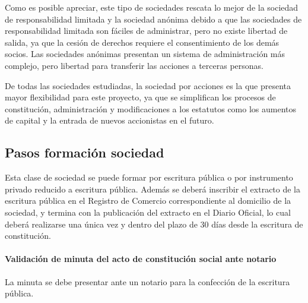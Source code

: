 Como es posible apreciar, este tipo de sociedades rescata lo mejor de la sociedad de responsabilidad
limitada y la sociedad anónima debido a que las sociedades de responsabilidad limitada son fáciles de administrar, 
pero no existe libertad de salida, ya que la cesión de derechos requiere el consentimiento de los demás socios. 
Las sociedades anónimas presentan un sistema de administración más complejo, pero libertad para transferir las acciones a terceras personas.

De todas las sociedades estudiadas, la sociedad por acciones 
es la que presenta mayor flexibilidad para este proyecto, ya que 
se simplifican los procesos de constitución, administración y modificaciones a los estatutos como los aumentos de capital
y la entrada de nuevos accionistas en el futuro.
 
\subsection{Pasos formación sociedad}
Esta clase de sociedad se puede formar por  escritura pública o por instrumento privado reducido a escritura pública. Además se deberá inscribir el extracto de la escritura pública en el Registro de Comercio correspondiente al
domicilio de la sociedad, y termina con la publicación del extracto en el
Diario Oficial, lo cual deberá realizarse una única vez y dentro del plazo de
30 días desde la escritura de constitución.




\paragraph{Validación de minuta del acto de constitución social ante notario}

	La minuta se debe presentar ante un notario para la confección de la escritura pública.

